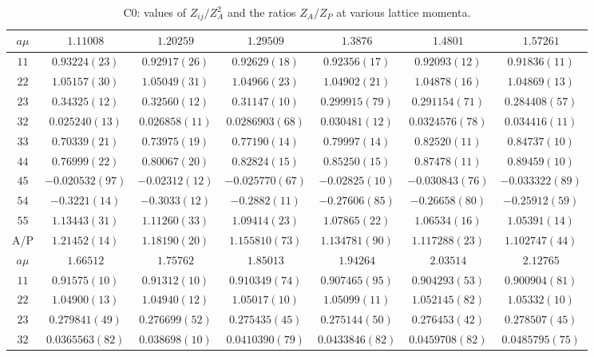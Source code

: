 \begin{table}
\begin{center}
\caption{C0: values of $Z_{ij}/Z_A^2$ and the ratios $Z_A/Z_P$ at various lattice momenta.}
\begin{tabular}{c|c c c c c c}
\hline
\hline
$a\mu$ & $1.11008$ & $1.20259$ & $1.29509$ & $1.3876$ & $1.4801$ & $1.57261$ \\
\hline
$11$ & $0.93224(23)$ & $0.92917(26)$ & $0.92629(18)$ & $0.92356(17)$ & $0.92093(12)$ & $0.91836(11)$ \\
$22$ & $1.05157(30)$ & $1.05049(31)$ & $1.04966(23)$ & $1.04902(21)$ & $1.04878(16)$ & $1.04869(13)$ \\
$23$ & $0.34325(12)$ & $0.32560(12)$ & $0.31147(10)$ & $0.299915(79)$ & $0.291154(71)$ & $0.284408(57)$ \\
$32$ & $0.025240(13)$ & $0.026858(11)$ & $0.0286903(68)$ & $0.030481(12)$ & $0.0324576(78)$ & $0.034416(11)$ \\
$33$ & $0.70339(21)$ & $0.73975(19)$ & $0.77190(14)$ & $0.79997(14)$ & $0.82520(11)$ & $0.84737(10)$ \\
$44$ & $0.76999(22)$ & $0.80067(20)$ & $0.82824(15)$ & $0.85250(15)$ & $0.87478(11)$ & $0.89459(10)$ \\
$45$ & $-0.020532(97)$ & $-0.02312(12)$ & $-0.025770(67)$ & $-0.02825(10)$ & $-0.030843(76)$ & $-0.033322(89)$ \\
$54$ & $-0.3221(14)$ & $-0.3033(12)$ & $-0.2882(11)$ & $-0.27606(85)$ & $-0.26658(80)$ & $-0.25912(59)$ \\
$55$ & $1.13443(31)$ & $1.11260(33)$ & $1.09414(23)$ & $1.07865(22)$ & $1.06534(16)$ & $1.05391(14)$ \\
\hline
A/P & $1.21452(14)$ & $1.18190(20)$ & $1.155810(73)$ & $1.134781(90)$ & $1.117288(23)$ & $1.102747(44)$ \\
\hline
$a\mu$ & $1.66512$ & $1.75762$ & $1.85013$ & $1.94264$ & $2.03514$ & $2.12765$ \\
\hline
$11$ & $0.91575(10)$ & $0.91312(10)$ & $0.910349(74)$ & $0.907465(95)$ & $0.904293(53)$ & $0.900904(81)$ \\
$22$ & $1.04900(13)$ & $1.04940(12)$ & $1.05017(10)$ & $1.05099(11)$ & $1.052145(82)$ & $1.05332(10)$ \\
$23$ & $0.279841(49)$ & $0.276699(52)$ & $0.275435(45)$ & $0.275144(50)$ & $0.276453(42)$ & $0.278507(45)$ \\
$32$ & $0.0365563(82)$ & $0.038698(10)$ & $0.0410390(79)$ & $0.0433846(82)$ & $0.0459708(82)$ & $0.0485795(75)$ \\

\end{tabular}
\end{center}
\end{table}
